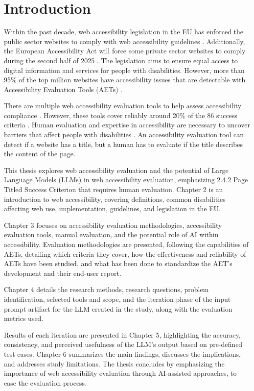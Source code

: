 \chapter{Introduction\label{intro}}

Within the past decade, web accessibility legislation in the EU has enforced the public sector websites to comply with web accessibility guidelines \citep{eudirective2016}. Additionally, the European Accessibility Act will force some private sector websites to comply during the second half of 2025 \citep{eudirective2019}. The legislation aims to ensure equal access to digital information and services for people with disabilities. However, more than 95\% of the top million websites have accessibility issues that are detectable with Accessibility Evaluation Tools (AETs) \citep{webaimmillions}.

There are multiple web accessibility evaluation tools to help assess accessibility compliance \citep{govukaccessibility}. However, these tools cover reliably around 20\% of the 86 success criteria \citep{govukaccessibilityresults, dequecoverage, webaimmillions}. Human evaluation and expertise in accessibility are necessary to uncover barriers that affect people with disabilities \citep{wcagevaluationtools}. An accessibility evaluation tool can detect if a website has a title, but a human has to evaluate if the title describes the content of the page. 

This thesis explores web accessibility evaluation and the potential of Large Language Models (LLMs) in web accessibility evaluation, emphasizing 2.4.2 Page Titled Success Criterion that requires human evaluation. Chapter 2 is an introduction to web accessibility, covering definitions, common disabilities affecting web use, implementation, guidelines, and legislation in the EU.

Chapter 3 focuses on accessibility evaluation methodologies, accessibility evaluation tools, manual evaluation, and the potential role of AI within accessibility. Evaluation methodologies are presented, following the capabilities of AETs, detailing which criteria they cover, how the effectiveness and reliability of AETs have been studied, and what has been done to standardize the AET's development and their end-user report.

Chapter 4 details the research methods, research questions, problem identification, selected tools and scope, and the iteration phase of the input prompt artifact for the LLM created in the study, along with the evaluation metrics used.

Results of each iteration are presented in Chapter 5, highlighting the accuracy, consistency, and perceived usefulness of the LLM's output based on pre-defined test cases. Chapter 6 summarizes the main findings, discusses the implications, and addresses study limitations. The thesis concludes by emphasizing the importance of web accessibility evaluation through AI-assisted approaches, to ease the evaluation process.